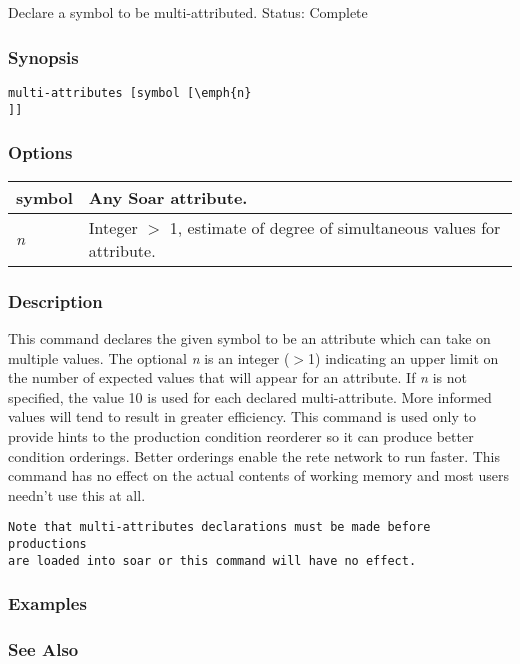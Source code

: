 \subsection{}
\label{multi-attributes}
Declare a symbol to be multi-attributed. 
 Status: Complete
\subsubsection*{Synopsis}
\begin{verbatim}
multi-attributes [symbol [\emph{n}
]] 
\end{verbatim}
\subsubsection*{Options}
\begin{tabular}{|l|l|}
\hline 
symbol & Any Soar attribute.  \\
 \hline 
\emph{n}
 & Integer $>$ 1, estimate of degree of simultaneous values for attribute.  \\
 \hline 
\end{tabular}
\subsubsection*{Description}
 This command declares the given symbol to be an attribute which can take on multiple values. The optional \emph{n}
 is an integer ($>$1) indicating an upper limit on the number of expected values that will appear for an attribute. If \emph{n}
 is not specified, the value 10 is used for each declared multi-attribute. More informed values will tend to result in greater efficiency. This command is used only to provide hints to the production condition reorderer so it can produce better condition orderings. Better orderings enable the rete network to run faster. This command has no effect on the actual contents of working memory and most users needn't use this at all. \begin{verbatim}
Note that multi-attributes declarations must be made before productions 
are loaded into soar or this command will have no effect.
\end{verbatim}
\subsubsection*{Examples}
\subsubsection*{See Also}
